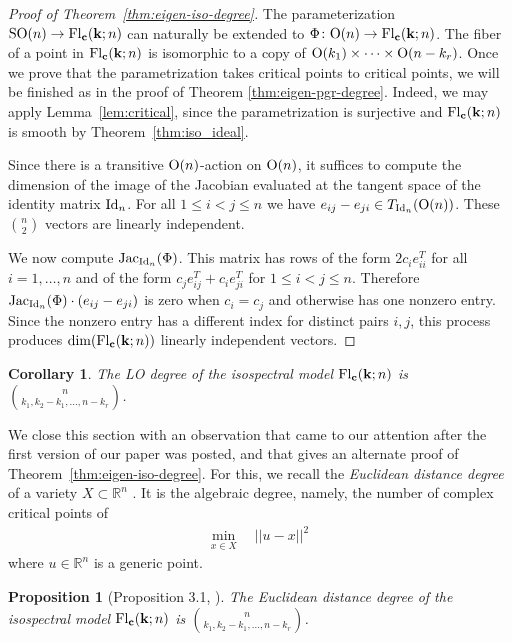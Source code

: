 \documentclass[12pt]{extarticle}
\newtheorem{proposition}[theorem]{Proposition}
\newtheorem{corollary}[theorem]{Corollary}
\theoremstyle{definition}
\numberwithin{theorem}{section}
\begin{document}
\begin{proof}[Proof of Theorem~\ref{thm:eigen-iso-degree}]
    The parameterization ${\rm SO}(n) \to {\rm Fl}_{\bf c}({\bf k}; n)$ can naturally be extended to $\Phi \colon {\rm O}(n) \to {\rm Fl}_{\bf c}({\bf k}; n)$. 
    The fiber of a point in ${\rm Fl}_{\bf c}({\bf k}; n)$ is isomorphic to a copy of ${\rm O}(k_1) \times \cdots \times {\rm O}(n - k_r)$. 
    Once we prove that the parametrization takes critical points to critical points, we will be finished as in the proof of Theorem \ref{thm:eigen-pgr-degree}.
    Indeed, we may apply Lemma~\ref{lem:critical}, since the parametrization is surjective and $ {\rm Fl}_{\bf c}({\bf k}; n)$ is smooth by Theorem~\ref{thm:iso_ideal}.     

    Since there is a transitive ${\rm O}(n)$-action on ${\rm O}(n)$, it suffices to compute the dimension of the image of the Jacobian evaluated at the tangent space of the identity matrix ${\rm Id}_n$. 
    For all $1 \leq i < j \leq n$ we have $e_{ij} - e_{ji} \in T_{{\rm Id}_n}({{\rm O}(n)})$. 
    These $\binom{n}{2}$ vectors are linearly independent. 

    We now compute ${\rm Jac}_{{\rm Id}_n}(\Phi)$. 
    This matrix has rows of the form $2c_i e_{ii}^T$ for all $i = 1, \ldots, n$ and of the form $c_je_{ij}^T + c_i e_{ji}^T$ for $1 \leq i < j \leq n$. 
    Therefore ${\rm Jac}_{{\rm Id}_n}(\Phi) \cdot (e_{ij} - e_{ji})$ is zero when $c_i = c_j$ and otherwise has one nonzero entry. 
    Since the nonzero entry has a different index for distinct pairs $i,j$, this process produces $\dim({\rm Fl}_{\bf c}({\bf k}; n))$ linearly independent vectors. 
\end{proof}
\begin{corollary}
    The LO degree of the isospectral model ${\rm Fl}_{\bf c}({\bf k};n)$ is $\binom{n}{k_1, k_2-k_1, \ldots, n-k_r}$.
\end{corollary}
We close this section with an observation that came to our attention after the first version of our paper was posted, and that gives an alternate proof of Theorem~\ref{thm:eigen-iso-degree}. For this, we recall the {\it Euclidean distance degree} of a variety $X \subset \mathbb{R}^n$ \cite{DHOST}. It is the algebraic degree, namely, the number of complex critical points of 
\begin{align} 
 \min_{x \in X} & \, \, \, || u - x ||^2
\end{align}
where $u \in \mathbb{R}^n$ is a generic point. 
\begin{proposition} [Proposition 3.1, \cite{LLY}] The Euclidean distance degree of the isospectral model ${\rm Fl}_{\bf c}({\bf k};n)$ is $\binom{n}{k_1, k_2-k_1, \ldots, n-k_r}$. 
\end{proposition}
\end{document}
